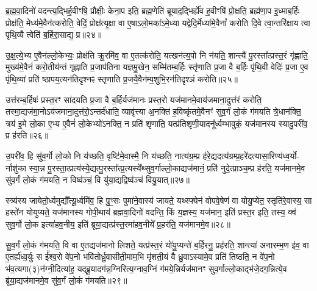 {\anuvakamend[{भ॒ज॒ति॒ प्र॒जाप॑तिनेव॒ वै त्रय॑स्त्रिꣳशच्च॥४॥}]}

ब्र॒ह्म॒वा॒दिनो॑ वदन्त्य॒द्भिर्\mbox{}ह॒वीꣳषि॒ प्रौक्षीः॒ केना॒प इति॒ ब्रह्म॒णेति॑ ब्रूयाद॒द्भिर्\mbox{}ह्ये॑व ह॒वीꣳषि॑ प्रो॒क्षति॒ ब्रह्म॑णा॒प इ॒ध्माब॒र्\mbox{}हिः प्रोक्ष॑ति॒ मेध्य॑मे॒वैन॑त्करोति॒ वेदिं॒ प्रोक्ष॑त्यृ॒क्षा वा ए॒षा\-ऽलो॒मका॑\-ऽमे॒ध्या यद्वेदि॒र्मेध्या॑मे॒वैनां᳚ करोति दि॒वे त्वा॒न्तरि॑क्षाय त्वा पृथि॒व्यै त्वेति॑ ब॒र्\mbox{}हिरा॒साद्य॒ प्र॥२४॥

उ॒क्ष॒त्ये॒भ्य ए॒वैन॑ल्लो॒केभ्यः॒ प्रोक्ष॑ति क्रू॒रमि॑व॒ वा ए॒तत्क॑रोति॒ यत्खन॑त्य॒पो नि न॑यति॒ शान्त्यै॑ पु॒रस्ता᳚त्प्रस्त॒रं गृ॑ह्णाति॒ मुख्य॑मे॒वैनं॑ करो॒तीय॑न्तं गृह्णाति प्र॒जाप॑तिना यज्ञमु॒खेन॒ सम्मि॑तम्ब॒र्\mbox{}हिः स्तृ॑णाति प्र॒जा वै ब॒र्\mbox{}हिः पृ॑थि॒वी वेदिः॑ प्र॒जा ए॒व पृ॑थि॒व्यां प्रति॑ ष्ठापय॒त्यन॑तिदृश्नꣴ स्तृणाति प्र॒जयै॒वैन॑म्प॒शुभि॒रन॑तिदृश्ञं करोति॥२५॥

उत्त॑रम्ब॒र्\mbox{}हिषः॑ प्रस्त॒रꣳ सा॑दयति प्र॒जा वै ब॒र्\mbox{}हिर्यज॑मानः प्रस्त॒रो यज॑मानमे॒वाय॑जमाना॒दुत्त॑रं करोति॒ तस्मा॒द्यज॑मा॒नो\-ऽय॑जमाना॒दुत्त॑रो॒\-ऽन्तर्द॑धाति॒ व्यावृ॑त्त्या अ॒नक्ति॑ ह॒विष्कृ॑तमे॒वैनꣳ॑ सुव॒र्गं लो॒कं ग॑मयति त्रे॒धान॑क्ति॒ त्रय॑ इ॒मे लो॒का ए॒भ्य ए॒वैनं॑ लो॒केभ्यो॑\-ऽनक्ति॒ न प्रति॑ शृणाति॒ यत्प्र॑तिशृणी॒यादनू᳚र्ध्वम्भावुकं॒ यज॑मानस्य स्यादु॒परी॑व॒ प्र ह॑रति॥२६॥

उ॒परी॑व॒ हि सु॑व॒र्गो लो॒को नि य॑च्छति॒ वृष्टि॑मे॒वास्मै॒ नि य॑च्छति॒ नात्य॑ग्र॒म्प्र ह॑रे॒द्यदत्य॑ग्रम्प्र॒हरे॑दत्यासा॒रिण्य॑ध्व॒र्यो- र्नाशु॑का स्या॒न्न पु॒रस्ता॒त्प्रत्य॑स्ये॒द्यत्पु॒रस्ता᳚त्प्र॒त्यस्ये᳚थ्सुव॒र्गाल्लो॒काद्यज॑मानं॒ प्रति॑ नुदे॒त्प्राञ्च॒म्प्र ह॑रति॒ यज॑मानमे॒व सु॑व॒र्गं लो॒कं ग॑मयति॒ न विष्व॑ञ्चं॒ वि यु॑या॒द्यद्विष्व॑ञ्चं वियु॒यात्॥२७॥

स्त्र्य॑स्य जायेतो॒र्ध्वमुद्यौ᳚त्यू॒र्ध्वमि॑व॒ हि पु॒ꣳ॒सः पुमा॑ने॒वास्य॑ जायते॒ यथ्स्फ्येन॑ वोपवे॒षेण॑ वा योयु॒प्येत॒ स्तृति॑रे॒वास्य॒ सा हस्ते॑न योयुप्यते॒ यज॑मानस्य गोपी॒थाय॑ ब्रह्मवा॒दिनो॑ वदन्ति॒ किं य॒ज्ञस्य॒ यज॑मान॒ इति॑ प्रस्त॒र इति॒ तस्य॒ क्व॑ सुव॒र्गो लो॒क इत्या॑हव॒नीय॒ इति॑ ब्रूया॒द्यत्प्र॑स्त॒रमा॑हव॒नीये᳚ प्र॒हर॑ति॒ यज॑मानमे॒व॥२८॥

सु॒व॒र्गं लो॒कं ग॑मयति॒ वि वा ए॒तद्यज॑मानो लिशते॒ यत्प्र॑स्त॒रं यो॑यु॒प्यन्ते॑ ब॒र्\mbox{}हिरनु॒ प्रह॑रति॒ शान्त्या॑ अनारम्भ॒ण इ॑व॒ वा ए॒तर्\mbox{}ह्य॑ध्व॒र्युः स ई᳚श्व॒रो वे॑प॒नो भवि॑तोर्ध्रु॒वासीती॒माम॒भि मृ॑शती॒यं वै ध्रु॒वा\-ऽस्यामे॒व प्रति॑ तिष्ठति॒ न वे॑प॒नो भ॑व॒त्यगा(३)न॑ग्नी॒दित्या॑ह॒ यद्ब्रू॒यादग॑न्न॒ग्निरित्य॒ग्नाव॒ग्निं ग॑मये॒न्निर्यज॑मानꣳ सुव॒र्गाल्लो॒काद्भ॑जे॒दग॒न्नित्ये॒व ब्रू॑या॒द्यज॑मानमे॒व सु॑व॒र्गं लो॒कं ग॑मयति॥२९॥

